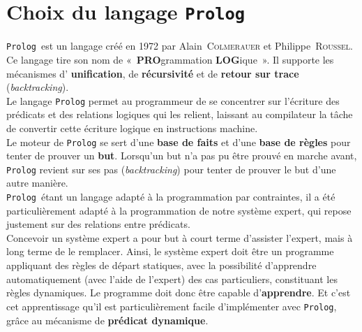 \chapter{Choix du langage \texttt{Prolog}}
\texttt{Prolog} est un langage créé en 1972 par Alain~\textsc{Colmerauer} et Philippe~\textsc{Roussel}. Ce langage tire son nom de «~\textbf{PRO}grammation \textbf{LOG}ique~». Il supporte les mécanismes d' \textbf{unification}, de \textbf{récursivité} et de \textbf{retour sur trace} (\textit{backtracking}).\\

Le langage \texttt{Prolog} permet au programmeur de se concentrer sur l'écriture des prédicats et des relations logiques qui les relient, laissant au compilateur la tâche de convertir cette écriture logique en instructions machine.\\

Le moteur de \texttt{Prolog} se sert d'une \textbf{base de faits} et d'une \textbf{base de règles} pour tenter de prouver un \textbf{but}. Lorsqu'un but n'a pas pu être prouvé en marche avant, \texttt{Prolog} revient sur ses pas (\textit{backtracking}) pour tenter de prouver le but d'une autre manière.\\

\texttt{Prolog} étant un langage adapté à la programmation par contraintes, il a été particulièrement adapté à la programmation de notre système expert, qui repose justement sur des relations entre prédicats.\\

Concevoir un système expert a pour but à court terme d'assister l'expert, mais à long terme de le remplacer. Ainsi, le système expert doit être un programme appliquant des règles de départ statiques, avec la possibilité d'apprendre automatiquement (avec l'aide de l'expert) des cas particuliers, constituant les règles dynamiques. Le programme doit donc être capable d'\textbf{apprendre}. Et c'est cet apprentissage qu'il est particulièrement facile d'implémenter avec \texttt{Prolog}, grâce au mécanisme de \textbf{prédicat dynamique}.
